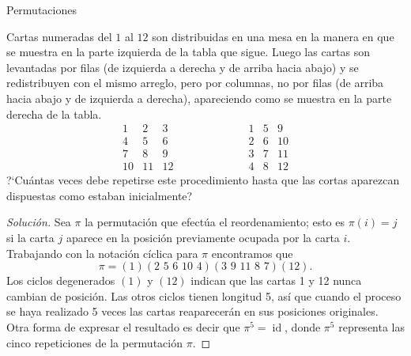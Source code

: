 \begin{section}{Permutaciones}
\begin{ejemplo}\label{cartas} Cartas numeradas del $1$ al $12$ son distribuidas en una mesa en la manera en que se muestra en la parte izquierda de la tabla que sigue. Luego las cartas son levantadas  por filas (de izquierda a derecha y de arriba hacia abajo) y se redistribuyen con el mismo arreglo, pero por columnas, no por filas (de arriba hacia abajo y de izquierda a derecha), apareciendo como se muestra en la parte derecha de la tabla.
$$
\begin{matrix} 1& 2& 3\\
4 &5 &6 \\
7 &8 & 9\\
10 &11 & 12 \end{matrix}\qquad \qquad\qquad
\begin{matrix}1 &5 &9 \\
2 &6 &10 \\
3& 7& 11\\
4&8 & 12 \end{matrix}
$$
?`Cuántas veces debe repetirse este procedimiento hasta que las cortas aparezcan dispuestas como estaban inicialmente?
\end{ejemplo}
\begin{proof}[Solución] Sea $\pi$ la permutación que efectúa el reordenamiento; esto es $\pi(i) =j$ si la carta $j$ aparece en la posición previamente ocupada por la carta $i$. Trabajando con la notación cíclica para $\pi$ encontramos que
$$
\pi=(1)(2\,\,5\,\,6\,\,10\,\,4)(3\,\,9\,\,11\,\,8\,\,7)(12).
$$
Los ciclos degenerados $(1)$ y $(12)$ indican que las cartas 1 y 12 nunca cambian de posición. Las otros ciclos tienen longitud 5, así que cuando el proceso se haya realizado 5 veces las cartas
reaparecerán en sus posiciones originales. Otra forma de expresar el resultado es decir que $\pi^5= \operatorname{id}$, donde $\pi^5$ representa las cinco repeticiones de la permutación $\pi$.
\end{proof}
\end{section}


